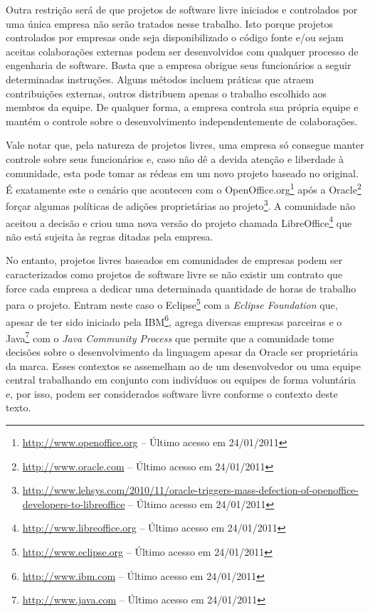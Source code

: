 Outra restrição será de que projetos de software livre iniciados e
controlados por uma única empresa não serão tratados nesse
trabalho. Isto porque projetos controlados por empresas onde seja
disponibilizado o código fonte e/ou sejam aceitas colaborações
externas podem ser desenvolvidos com qualquer processo de engenharia
de software. Basta que a empresa obrigue seus funcionários a seguir
determinadas instruções. Alguns métodos incluem práticas que atraem
contribuições externas, outros distribuem apenas o trabalho escolhido
aos membros da equipe. De qualquer forma, a empresa controla sua
própria equipe e mantém o controle sobre o desenvolvimento
independentemente de colaborações.

Vale notar que, pela natureza de projetos livres, uma empresa só
consegue manter controle sobre seus funcionários e, caso não dê a
devida atenção e liberdade à comunidade, esta pode tomar as rédeas em
um novo projeto baseado no original.  É exatamente este o cenário que
aconteceu com o
OpenOffice.org\footnote{\url{http://www.openoffice.org} -- Último
  acesso em 24/01/2011} após a
Oracle\footnote{\url{http://www.oracle.com} -- Último acesso em
  24/01/2011} forçar algumas políticas de adições proprietárias ao
projeto\footnote{\url{http://www.lehsys.com/2010/11/oracle-triggers-mass-defection-of-openoffice-developers-to-libreoffice}
  -- Último acesso em 24/01/2011}. A comunidade não aceitou a decisão
e criou uma nova versão do projeto chamada
LibreOffice\footnote{\url{http://www.libreoffice.org} -- Último acesso
  em 24/01/2011} que não está sujeita às regras ditadas pela empresa.

No entanto, projetos livres baseados em comunidades de empresas podem
ser caracterizados como projetos de software livre se não existir um
contrato que force cada empresa a dedicar uma determinada quantidade
de horas de trabalho para o projeto. Entram neste caso o
Eclipse\footnote{\url{http://www.eclipse.org} -- Último acesso em
  24/01/2011} com a \emph{Eclipse Foundation} que, apesar de ter sido
iniciado pela IBM\footnote{\url{http://www.ibm.com} -- Último acesso
  em 24/01/2011}, agrega diversas empresas parceiras e o
Java\footnote{\url{http://www.java.com} -- Último acesso em
  24/01/2011} com o \emph{Java Community Process} que permite que a
comunidade tome decisões sobre o desenvolvimento da linguagem apesar
da Oracle ser proprietária da marca. Esses contextos se assemelham ao
de um desenvolvedor ou uma equipe central trabalhando em conjunto com
indivíduos ou equipes de forma voluntária e, por isso, podem ser
considerados software livre conforme o contexto deste texto.

